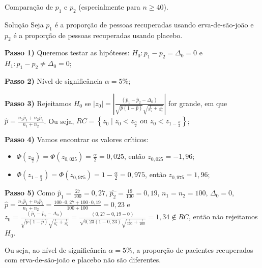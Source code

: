 \documentclass[9pt]{beamer}
\begin{document}
\begin{frame}{Comparação de $p_1$ e $p_2$ (especialmente para $n 
\geq 40$).}

\footnotesize
\begin{block}{Solução}
	Seja $p_1$ é a proporção de pessoas recuperadas usando erva-de-são-joão e $p_2$ é a proporção de pessoas recuperadas usando placebo.
	
	\textbf{Passo 1)} Queremos testar as hipóteses: $H_0: p_1 - p_2 = \Delta_0=0$ e $H_1: p_1 - p_2 \neq \Delta_0=0$;
	
	\textbf{Passo 2)} Nível de significância $\alpha=5\%$;
	
	\textbf{Passo 3)} Rejeitamos $H_0$ se $\lvert z_0 \rvert = \left\lvert \frac{(\hat{p}_1 - \hat{p}_2 - \Delta_0)}{\sqrt{\hat{p}(1 - \hat{p})}\sqrt{\frac{1}{n_1} + \frac{1}{n_2}}} \right\rvert$ for grande, em que $\hat{p} = \frac{n_1 \hat{p}_1 + n_2 \hat{p}_2}{n_1 + n_2}$. Ou seja, $RC = \left\{ z_0 \mid z_0 < z_\frac{\alpha}{2} \mbox{ ou } z_0 < z_{1-\frac{\alpha}{2}} \right\}$;
	
	\textbf{Passo 4)} Vamos encontrar os valores críticos:
	\begin{itemize}
		\item $\Phi\left( z_\frac{\alpha}{2} \right) = \Phi\left( z_{0,025} \right) = \frac{\alpha}{2} = 0,025$, então $z_{0,025} = -1,96$;
		\item $\Phi\left( z_{1-\frac{\alpha}{2}} \right) = \Phi\left( z_{0,975} \right) = 1-\frac{\alpha}{2} = 0,975$, então $z_{0,975} = 1,96$;
	\end{itemize}

	\textbf{Passo 5)} Como $\hat{p}_1 = \frac{27}{100} = 0,27$, $\hat{p_2} = \frac{19}{100}=0,19$, $n_1=n_2=100$, $\Delta_0=0$, $\hat{p} = \frac{n_1 \hat{p}_1 + n_2 \hat{p}_2}{n_1 + n_2} = \frac{100\cdot 0,27 + 100\cdot 0,19}{100 + 100} = 0,23$ e $z_0 = \frac{(\hat{p}_1 - \hat{p}_2 - \Delta_0)}{\sqrt{\hat{p}(1 - \hat{p})}\sqrt{\frac{1}{n_1} + \frac{1}{n_2}}} = \frac{(0,27 - 0,19 - 0)}{\sqrt{0,23(1 - 0,23)}\sqrt{\frac{1}{100} + \frac{1}{100}}} = 1,34 \not\in RC$, então não rejeitamos $H_0$. 
	
	Ou seja, ao nível de significância $\alpha=5\%$, a proporção de pacientes recuperados com erva-de-são-joão e placebo não são diferentes.
\end{block}
\normalsize
\end{frame}
\end{document}
